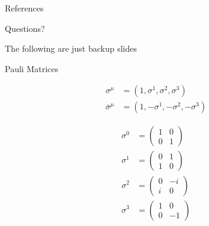 \documentclass[10pt]{beamer}
\begin{document}
\begin{frame}[allowframebreaks]{References}

  
  

\end{frame}

{
\begin{frame}[standout]
  Questions?
\end{frame}
}

\appendix

{
\begin{frame}[standout]
  The following are just backup slides
\end{frame}
}

\begin{frame}[fragile]{Pauli Matrices}

    \begin{align*}
        \sigma^{\mu} &= (1, \sigma^1, \sigma^2, \sigma^3) \\
        \overline{\sigma}^{\mu} &= (1, -\sigma^1, -\sigma^2, -\sigma^3)
    \end{align*}
  
    \begin{align*}
        \sigma^0 &= 
        \begin{pmatrix}
            1 & 0 \\
            0 & 1
        \end{pmatrix} \\
        \sigma^1 &= 
        \begin{pmatrix}
            0 & 1 \\
            1 & 0
        \end{pmatrix} \\
        \sigma^2 &= 
        \begin{pmatrix}
            0 & -i \\
            i & 0
        \end{pmatrix} \\
        \sigma^3 &= 
        \begin{pmatrix}
            1 & 0 \\
            0 & -1
        \end{pmatrix} \\
	\end{align*}

\end{frame}
\end{document}
